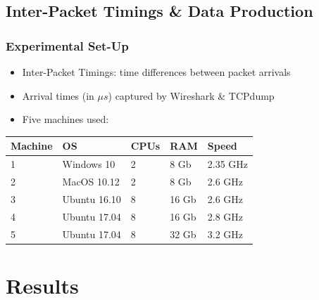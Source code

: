 \documentclass{beamer}
\begin{document}
\subsection{Inter-Packet Timings \& Data Production}
\begin{frame}
\frametitle{Experimental Set-Up}
\begin{itemize}
\item Inter-Packet Timings: time differences between packet arrivals
\item Arrival times (in $\mu s$) captured by Wireshark \& TCPdump
\item Five machines used: 
\end{itemize}

\begin{table}
\begin{tabular}{|l|l|l|l|l|}
\hline
\textbf{Machine} & \textbf{OS} &\textbf{CPUs} &\textbf{RAM} &\textbf{Speed} \\
\hline
1 & Windows 10 & 2 & 8 Gb & 2.35 GHz \\ 
\hline 
2 & MacOS 10.12 & 2 & 8 Gb & 2.6 GHz \\
\hline 
3 & Ubuntu 16.10 & 8 & 16 Gb &  2.6 GHz \\ 
\hline 
4 & Ubuntu 17.04 & 8 & 16 Gb & 2.8 GHz \\
\hline 
5 & Ubuntu 17.04 & 8 & 32 Gb & 3.2 GHz \\
\hline
\end{tabular}
\end{table}
\end{frame}
\section{Results}
\begin{frame}
\end{frame}
\end{document}
